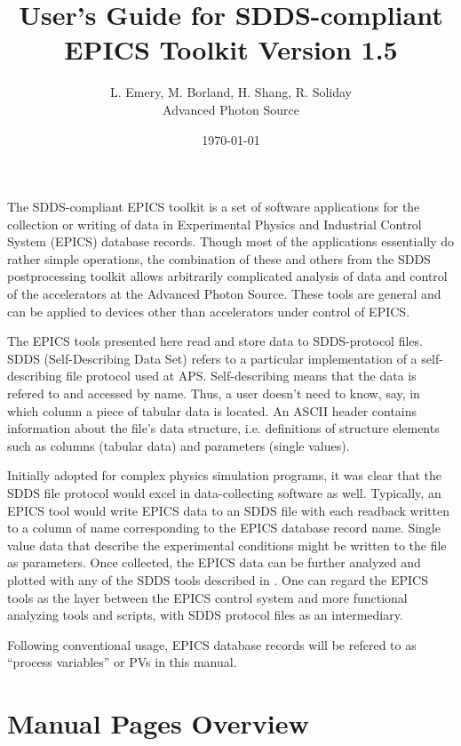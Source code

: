 \documentclass[11pt]{article}
\begin{document}
\title{User's Guide for SDDS-compliant EPICS Toolkit Version 1.5}
\author{L. Emery, M. Borland, H. Shang, R. Soliday\\Advanced Photon Source\\ \date{\today}}
\maketitle

The SDDS-compliant EPICS toolkit is a set of software applications for
the collection or writing of data in Experimental Physics and
Industrial Control System (EPICS) database records.  Though most of
the applications essentially do rather simple operations, the
combination of these and others from the SDDS postprocessing toolkit
allows arbitrarily complicated analysis of data and control of the
accelerators at the Advanced Photon Source. These tools are general
and can be applied to devices other than accelerators under control of
EPICS.

The EPICS tools presented here read and store data to SDDS-protocol
files.  SDDS (Self-Describing Data Set)\cite{SDDS_AP1.4} refers to a
particular implementation of a self-describing file protocol used at
APS. Self-describing means that the data is refered to and accessed by
name. Thus, a user doesn't need to know, say, in which column a piece
of tabular data is located. An ASCII header contains information about the
file's data structure, i.e. definitions of structure elements
such as columns (tabular data) and parameters (single values). 

Initially adopted for complex physics simulation programs, it was clear
that the SDDS file protocol would excel in data-collecting software as
well. Typically, an EPICS tool would write EPICS data to an SDDS file with 
each readback written to a column of name corresponding to the 
EPICS database record name. Single value data that describe the experimental conditions
might be written to the file as parameters.
Once collected, the EPICS data can be further analyzed and plotted
with any of the SDDS tools described in \cite{SDDS_AP1.4}.
One can regard the EPICS tools as the layer between the EPICS
control system and more functional analyzing tools and scripts, with
SDDS protocol files as an intermediary.

Following conventional usage, EPICS database records will be refered
to as ``process variables'' or PVs in this manual.

\section{Manual Pages Overview}
\end{document}
